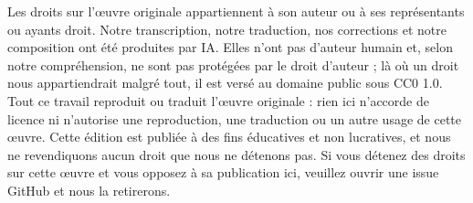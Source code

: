 \documentclass[11pt,a4paper,leqno]{article}
\begin{document}

\par\vspace{2\baselineskip}
\noindent\begin{minipage}{\linewidth}\small Les droits sur l'œuvre originale appartiennent à son auteur ou à ses représentants ou ayants droit. Notre transcription, notre traduction, nos corrections et notre composition ont été produites par IA. Elles n'ont pas d'auteur humain et, selon notre compréhension, ne sont pas protégées par le droit d'auteur ; là où un droit nous appartiendrait malgré tout, il est versé au domaine public sous CC0 1.0. Tout ce travail reproduit ou traduit l'œuvre originale : rien ici n'accorde de licence ni n'autorise une reproduction, une traduction ou un autre usage de cette œuvre. Cette édition est publiée à des fins éducatives et non lucratives, et nous ne revendiquons aucun droit que nous ne détenons pas. Si vous détenez des droits sur cette œuvre et vous opposez à sa publication ici, veuillez ouvrir une issue GitHub et nous la retirerons.\end{minipage}\par
\end{document}
